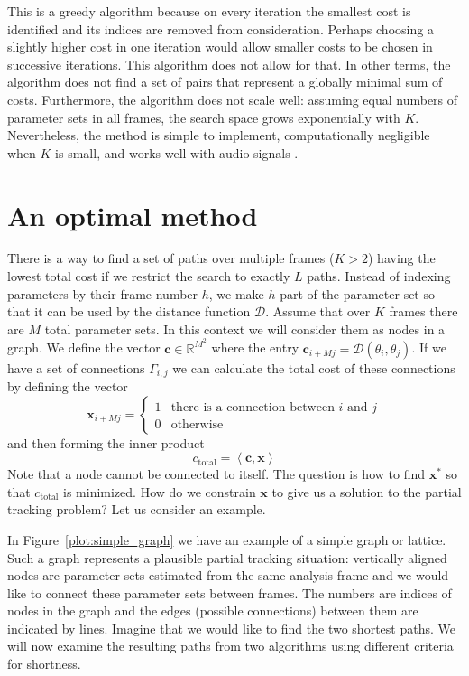 \documentclass{article}
\begin{document}
\begin{sloppy}
This is a greedy algorithm because on every iteration the smallest cost is
identified and its indices are removed from consideration. Perhaps choosing a
slightly higher cost in one iteration would allow smaller costs to be chosen in
successive iterations. This algorithm does not allow for that. In other terms,
the algorithm does not find a set of pairs that represent a globally minimal sum of
costs.
Furthermore, the algorithm does not scale well: assuming equal numbers of
parameter sets in all frames, the search space grows exponentially with
$K$. Nevertheless, the method is simple to implement, computationally negligible
when $K$ is small, and works well with audio signals \cite{mcaulay1986speech}
\cite{smith1987parshl}.

\section{An optimal method \label{sec:lppathsearch}}

There is a way to find a set of paths over multiple frames ($K > 2$) having the
lowest total cost if
we restrict the search to exactly $L$ paths. Instead of indexing parameters by
their frame number $h$, we make $h$ part of the parameter set so that it can be
used by the distance function $\mathcal{D}$. Assume that over $K$ frames there
are $M$ total parameter sets. In this context we will consider them as nodes in
a graph. We define the vector $\boldsymbol{c} \in \mathbb{R}^{M^2}$
where the entry $\boldsymbol{c}_{i + Mj} = \mathcal{D} \left( \theta_{i}, \theta_{j}
\right)$. If we have a set of connections $\Gamma_{i,j}$ we can calculate the
total cost of these connections by defining the vector
\[
    \boldsymbol{x}_{i + Mj} = \begin{cases}
        1 & \text{there is a connection between }i\text{ and }j\\
        0 & \text{otherwise}
    \end{cases}
\]
and then forming the inner product
\[
    c_{\text{total}}=\left\langle \boldsymbol{c},\boldsymbol{x} \right\rangle
\]
Note that a node cannot be connected to itself. The question is how to find
$\boldsymbol{x}^{\ast}$ so that $c_{\text{total}}$ is minimized. How do we
constrain $\boldsymbol{x}$ to give us a solution to the partial tracking
problem? Let us consider an example.

In Figure~\ref{plot:simple_graph} we have an example of a simple graph or
lattice. Such a graph represents a plausible partial tracking situation:
vertically aligned nodes are parameter sets estimated from the same analysis
frame and we would like to connect these parameter sets between frames. The
numbers are indices of nodes in the graph and the edges (possible connections) between
them are indicated by lines. Imagine that we would like to
find the two shortest paths. We will now examine the resulting paths from two
algorithms using different criteria for shortness.


\end{sloppy}
\end{document}
